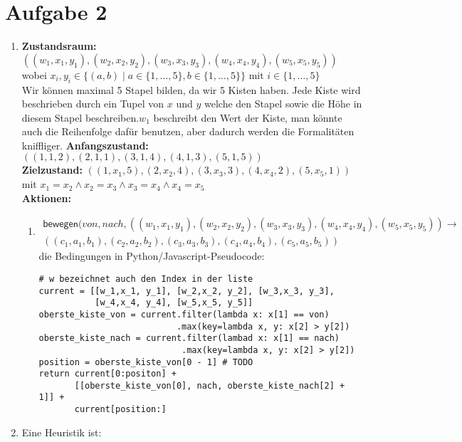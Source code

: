 \documentclass[a4paper,10pt]{article}
\begin{document}
\section*{Aufgabe 2}
\begin{enumerate}[~~a)]
    \item 
    \textbf{Zustandsraum:} 
    $((w_1, x_1, y_1), (w_2, x_2, y_2), (w_3, x_3, y_3), (w_4, x_4, y_4), (w_5, x_5, y_5))$ wobei $ x_i, y_i \in \{ (a, b) \mid a \in \{1,\dots,5\}, b \in \{1,\dots,5\}\} \text{ mit }i \in \{1,\dots,5\}$ \\
    Wir können maximal 5 Stapel bilden, da wir 5 Kisten haben. Jede Kiste wird beschrieben durch ein Tupel von $x$ und $y$ welche den Stapel sowie die Höhe in diesem Stapel beschreiben.$w_1$ beschreibt den Wert der Kiste, man könnte auch die Reihenfolge dafür benutzen, aber dadurch werden die Formalitäten kniffliger.
    \textbf{Anfangszustand:}
    $((1,1,2),(2,1,1),(3,1,4),(4,1,3),(5,1,5))$ \\
    \textbf{Zielzustand:}
    $((1,x_1,5),(2,x_2,4),(3,x_3,3),(4,x_4,2),(5,x_5,1))$ mit $x_1 = x_2 \land x_2 = x_3 \land x_3 = x_4 \land x_4 = x_5$\\
    \textbf{Aktionen:}
    \begin{enumerate}[~~1.]
    \item \begin{align*}\textsf{bewegen}(von, nach, ((w_1,x_1, y_1), (w_2,x_2, y_2), (w_3,x_3, y_3), (w_4,x_4, y_4), (w_5,x_5, y_5)) \rightarrow  \\ ((c_1, a_1, b_1), (c_2, a_2, b_2), (c_3, a_3, b_3), (c_4, a_4, b_4), (c_5, a_5, b_5))\end{align*} 
    die Bedingungen in Python/Javascript-Pseudocode:
\begin{lstlisting}
# w bezeichnet auch den Index in der liste
current = [[w_1,x_1, y_1], [w_2,x_2, y_2], [w_3,x_3, y_3],
           [w_4,x_4, y_4], [w_5,x_5, y_5]]
oberste_kiste_von = current.filter(lambda x: x[1] == von)
                           .max(key=lambda x, y: x[2] > y[2])
oberste_kiste_nach = current.filter(lambad x: x[1] == nach)
                            .max(key=lambda x, y: x[2] > y[2])
position = oberste_kiste_von[0 - 1] # TODO
return current[0:positon] +
       [[oberste_kiste_von[0], nach, oberste_kiste_nach[2] + 1]] +
       current[position:]

\end{lstlisting}
    \end{enumerate}
    \item Eine Heuristik ist:
    
\end{enumerate}
\end{document}
